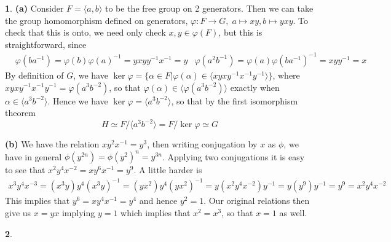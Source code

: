 \documentclass[10.5pt]{article}
\theoremstyle{definition}
\newtheorem{pb}{}
\newcommand{\set}[1]{\{#1\}}
\newcommand{\gen}[1]{\langle #1 \rangle}
\newcommand{\ism}{\simeq}
\begin{document}
    \begin{pb}
        \textbf{(a)}
        Consider \(F = \gen{a,b}\) to be the free group on 2 generators. Then we can take the group homomorphism defined on generators, 
        \(\varphi: F \to G, \;a \mapsto xy, b \mapsto yxy\). To check that this is onto, we need only check \(x,y \in \varphi(F)\), but this is straightforward, since
        \begin{align*}
            &\varphi(ba^{-1}) = \varphi(b)\varphi(a)^{-1} = yxyy^{-1}x^{-1} = y &\varphi(a^2b^{-1}) = \varphi(a)\varphi(ba^{-1})^{-1} = xyy^{-1} = x
        \end{align*}
        By definition of \(G\), we have \(\ker \varphi = \set{\alpha \in F \vert \varphi(\alpha) \in \gen{xyxy^{-1}x^{-1}y^{-1}}}\), where
        \(xyxy^{-1}x^{-1}y^{-1} = \varphi(a^3b^{-2})\), so that \(\varphi(\alpha) \in \gen{\varphi(a^3b^{-2})}\) exactly when \(\alpha \in \gen{a^3b^{-2}}\).
        Hence we have
        \(\ker \varphi = \gen{a^3b^{-2}}\), so that by the first isomorphism theorem \[H \ism F/\gen{a^3b^{-2}} = F/\ker \varphi \ism G\]

        \textbf{(b)} We have the relation \(xy^2x^{-1} = y^3\), then writing conjugation by \(x\) as \(\phi\), we have in general \(\phi(y^{2n}) = \phi(y^2)^n = y^{3n}\).
        Applying two conjugations it is easy to see that \(x^2y^4x^{-2} = xy^6x^{-1} = y^9\). A little harder is
        \begin{align*}
            x^3y^4x^{-3} = (x^3y)y^4(x^3y)^{-1} = (yx^2)y^4(yx^2)^{-1} = y(x^2y^4x^{-2})y^{-1} = y(y^9)y^{-1} = y^9 = x^2y^4x^{-2}
        \end{align*}
        This implies that \(y^6 = xy^4x^{-1} = y^4\) and hence \(y^2 = 1\). Our original relations then give us \(x = yx\) implying \(y=1\) which implies that \(x^2 = x^3\), so that \(x = 1\) as well.
    \end{pb}
    \begin{pb}
        
    \end{pb}
\end{document}
